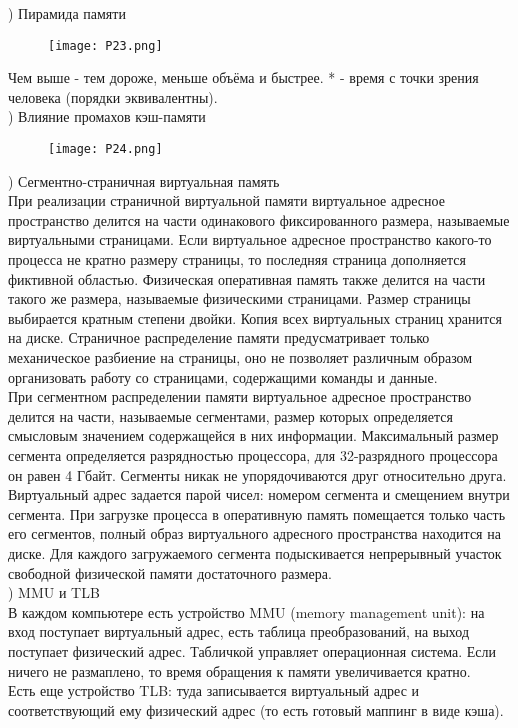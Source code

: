 ) Пирамида памяти \\
\begin{figure}[H]
    \centering
    \texttt{[image: P23.png]}
\end{figure}
\noindent Чем выше - тем дороже, меньше объёма и быстрее. * - время с точки зрения человека (порядки эквивалентны). \\

) Влияние промахов кэш-памяти  \\
\begin{figure}[H]
    \centering
    \texttt{[image: P24.png]}
\end{figure}

) Сегментно-страничная виртуальная память \\
При реализации страничной виртуальной памяти виртуальное адресное пространство делится на части одинакового фиксированного размера, называемые виртуальными страницами. Если виртуальное адресное пространство какого-то процесса не кратно размеру страницы, то последняя страница дополняется фиктивной областью. Физическая оперативная память также делится на части такого же размера, называемые физическими страницами. Размер страницы выбирается кратным степени двойки. Копия всех виртуальных страниц хранится на диске.
Страничное распределение памяти предусматривает только механическое разбиение на страницы, оно не позволяет различным образом организовать работу со страницами, содержащими команды и данные. \\
При сегментном распределении памяти виртуальное адресное пространство делится на части, называемые сегментами, размер которых определяется смысловым значением содержащейся в них информации. Максимальный размер сегмента определяется разрядностью процессора, для 32-разрядного процессора он равен 4 Гбайт. Сегменты никак не упорядочиваются друг относительно друга. Виртуальный адрес задается парой чисел: номером сегмента и смещением внутри сегмента. При загрузке процесса в оперативную память помещается только часть его сегментов, полный образ виртуального адресного пространства находится на диске. Для каждого загружаемого сегмента подыскивается непрерывный участок свободной физической памяти достаточного размера. \\
\newpage
{}) MMU и TLB \\
В каждом компьютере есть устройство MMU (memory management unit): на вход поступает виртуальный адрес, есть таблица преобразований, на выход поступает физический адрес. Табличкой управляет операционная система. Если ничего не размаплено, то время обращения к памяти увеличивается кратно. \\
Есть еще устройство TLB: туда записывается виртуальный адрес и соответствующий ему физический адрес (то есть готовый маппинг в виде кэша). \\

